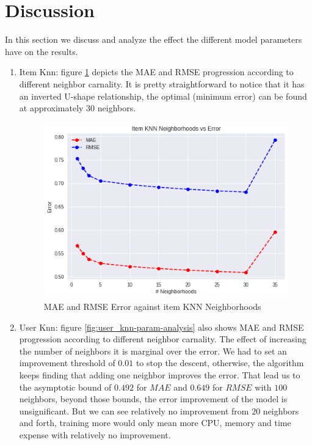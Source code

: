 \documentclass[letterpaper, 10 pt, conference]{ieeeconf}  %
\begin{document}
\section{Discussion}

In this section we discuss and analyze the effect the different model parameters have on the results.\\

\begin{enumerate}
    \item Item Knn: figure \ref{fig:item_knn-param-analysis} depicts the MAE and RMSE progression according to different neighbor carnality. It is pretty straightforward to notice that it has an inverted U-shape relationship, the optimal (minimum error) can be found at approximately 30 neighbors.
    
    \begin{figure}[h]
        \includegraphics[scale=0.4]{item_knn-param-analysis.png}
        \centering
        \caption{MAE and RMSE Error against item KNN Neighborhoods}
        \label{fig:item_knn-param-analysis}
    \end{figure}
        
    \item User Knn: figure \ref{fig:user_knn-param-analysis} also shows MAE and RMSE progression according to different neighbor carnality. The effect of increasing the number of neighbors it is marginal over the error. We had to set an improvement threshold of $0.01$ to stop the descent, otherwise, the algorithm keeps finding that adding one neighbor improves the error. That lead us to the asymptotic bound of $0.492$ for $MAE$ and $0.649$ for $RMSE$ with $100$ neighbors, beyond those bounds, the error improvement of the model is unsignificant. But we can see relatively no improvement from $20$ neighbors and forth, training more would only mean more CPU, memory and time expense with relatively no improvement. 
    

\end{enumerate}
\end{document}
